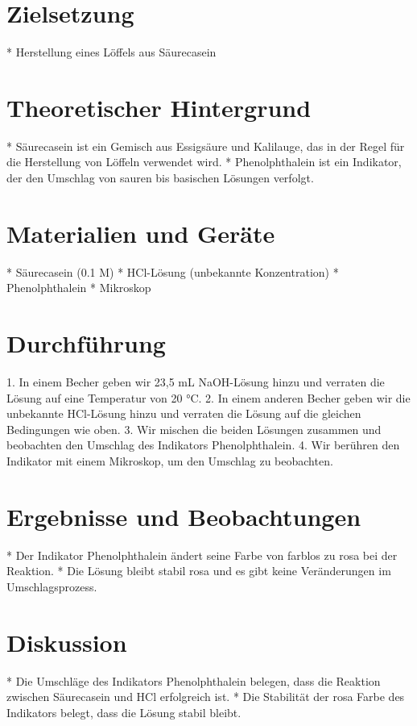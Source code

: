 \documentclass{article}%
\begin{document}
%
\normalsize%
\pagestyle{fancy}%
\fancyhf{}%
%
\fancyhead{[R]{\today}}%
%
\section{Zielsetzung}%
\label{sec:Zielsetzung}%
* Herstellung eines Löffels aus Säurecasein

%
\section{Theoretischer Hintergrund}%
\label{sec:TheoretischerHintergrund}%
* Säurecasein ist ein Gemisch aus Essigsäure und Kalilauge, das in der Regel für die Herstellung von Löffeln verwendet wird.
* Phenolphthalein ist ein Indikator, der den Umschlag von sauren bis basischen Lösungen verfolgt.

%
\section{Materialien und Geräte}%
\label{sec:MaterialienundGerte}%
* Säurecasein (0.1 M)
* HCl-Lösung (unbekannte Konzentration)
* Phenolphthalein
* Mikroskop

%
\section{Durchführung}%
\label{sec:Durchfhrung}%
1. In einem Becher geben wir 23,5 mL NaOH-Lösung hinzu und verraten die Lösung auf eine Temperatur von 20 °C.
2. In einem anderen Becher geben wir die unbekannte HCl-Lösung hinzu und verraten die Lösung auf die gleichen Bedingungen wie oben.
3. Wir mischen die beiden Lösungen zusammen und beobachten den Umschlag des Indikators Phenolphthalein.
4. Wir berühren den Indikator mit einem Mikroskop, um den Umschlag zu beobachten.

%
\section{Ergebnisse und Beobachtungen}%
\label{sec:ErgebnisseundBeobachtungen}%
* Der Indikator Phenolphthalein ändert seine Farbe von farblos zu rosa bei der Reaktion.
* Die Lösung bleibt stabil rosa und es gibt keine Veränderungen im Umschlagsprozess.

%
\section{Diskussion}%
\label{sec:Diskussion}%
* Die Umschläge des Indikators Phenolphthalein belegen, dass die Reaktion zwischen Säurecasein und HCl erfolgreich ist.
* Die Stabilität der rosa Farbe des Indikators belegt, dass die Lösung stabil bleibt.
\end{document}
